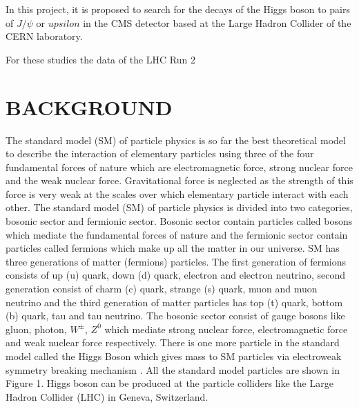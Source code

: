 \documentclass[final,3p]{CSP}
\begin{document}
\begin{adjustwidth}{1cm}{1cm}
\onehalfspacing In this project, it is proposed to search for the decays of the Higgs boson to pairs of $J/\psi$ or $upsilon$ in the CMS detector based at the Large Hadron Collider of the CERN laboratory. 

For these studies the data of the LHC Run 2



\end{adjustwidth}

\hspace{2pt}
\vfill

\newpage
\section{BACKGROUND}


\onehalfspacing The standard model (SM) of particle physics is so far the best theoretical model to describe the interaction of elementary 
particles using three of the four fundamental forces of nature which are electromagnetic force, strong nuclear force and the 
weak nuclear force. Gravitational force is neglected as the strength of this force is very weak at the scales over which 
elementary particle interact with each other. The standard model (SM) of particle physics is divided into two categories, 
bosonic sector and fermionic sector. Bosonic sector contain particles called bosons which mediate the fundamental forces of 
nature and the fermionic sector contain particles called fermions which make up all the matter in our universe. SM has three 
generations of matter (fermions) particles. The first generation of fermions consists of up (u) quark, down (d) quark, electron 
and electron neutrino, second generation consist of charm (c) quark, strange (s) quark, muon and muon neutrino and the third 
generation of matter particles has top (t) quark, bottom (b) quark, tau and tau neutrino. The bosonic sector consist of gauge 
bosons like gluon, photon, $W^{\pm}$, $Z^0$ which mediate strong nuclear force, electromagnetic force and weak nuclear force respectively. There is one more particle in the standard model called the Higgs Boson which gives mass to SM particles via electroweak symmetry breaking mechanism \cite{Chatrchyan:2012xdj}. All the standard model particles are shown in Figure 1. Higgs boson can be produced at the particle colliders like the Large Hadron Collider (LHC) in Geneva, Switzerland.
\end{document}
